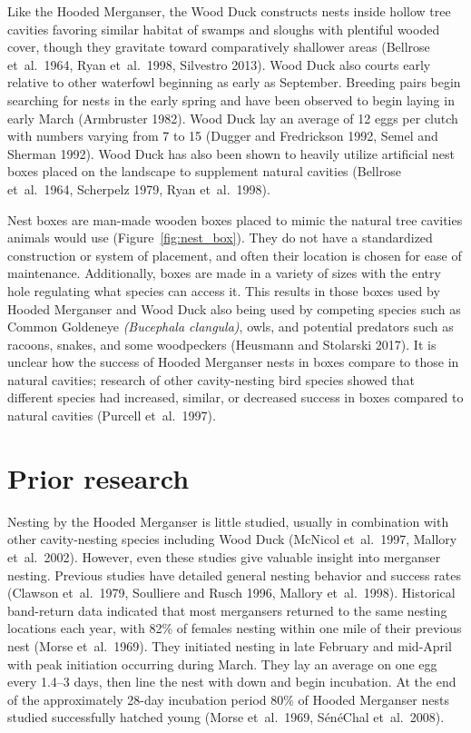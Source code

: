  

Like the Hooded Merganser, the Wood Duck constructs nests inside hollow tree cavities favoring similar habitat of swamps and sloughs with plentiful wooded cover, though they gravitate toward comparatively shallower areas (Bellrose et~al.~1964, Ryan et~al.~1998, Silvestro 2013). Wood Duck also courts early relative to other waterfowl beginning as early as September. Breeding pairs begin searching for nests in the early spring and have been observed to begin laying in early March (Armbruster 1982). Wood Duck lay an average of 12 eggs per clutch with numbers varying from 7 to 15 (Dugger and Fredrickson 1992, Semel and Sherman 1992). Wood Duck has also been shown to heavily utilize artificial nest boxes placed on the landscape to supplement natural cavities (Bellrose et~al.~1964, Scherpelz 1979, Ryan et~al.~1998).   

Nest boxes are man-made wooden boxes placed to mimic the natural tree cavities animals would use (Figure~\ref{fig:nest_box}). They do not have a standardized construction or system of placement, and often their location is chosen for ease of maintenance. Additionally, boxes are made in a variety of sizes with the entry hole regulating what species can access it. This results in those boxes used by Hooded Merganser and Wood Duck also being used by competing species such as Common Goldeneye \textit{(Bucephala clangula)}, owls, and potential predators such as racoons, snakes, and some woodpeckers (Heusmann and Stolarski 2017). It is unclear how the success of Hooded Merganser nests in boxes compare to those in natural cavities; research of other cavity-nesting bird species showed that different species had increased, similar, or decreased success in boxes compared to natural cavities (Purcell et~al.~1997).

 


\section*{Prior research}

Nesting by the Hooded Merganser is little studied, usually in combination with other cavity-nesting species including Wood Duck (McNicol et~al.~1997, Mallory et~al.~2002). However, even these studies give valuable insight into merganser nesting. Previous studies have detailed general nesting behavior and success rates (Clawson et~al.~1979, Soulliere and Rusch 1996, Mallory et~al.~1998). Historical band-return data indicated that most mergansers returned to the same nesting locations each year, with 82\% of females nesting within one mile of their previous nest (Morse et~al.~1969). They initiated nesting in late February and mid-April with peak initiation occurring during March. They lay an average on one egg every 1.4–3 days, then line the nest with down and begin incubation. At the end of the approximately 28-day incubation period 80\% of Hooded Merganser nests studied successfully hatched young (Morse et~al.~1969, SénéChal et~al.~2008).  


